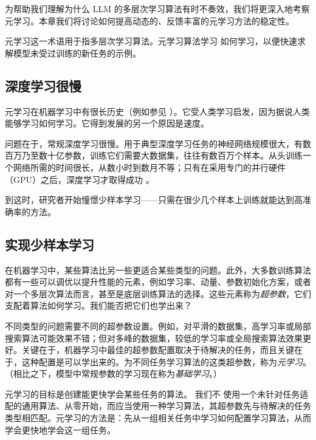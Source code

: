 为帮助我们理解为什么 LLM 的多层次学习算法有时不奏效，我们将更深入地考察元学习。本章我们将讨论如何提高动态的、反馈丰富的元学习方法的稳定性。



元学习这一术语用于指多层次学习算法。元学习算法学习
如何学习，以便快速求解模型未受过训练的新任务的示例。
    
\subsection{深度学习很慢}
元学习在机器学习中有很长历史（例如参见 \citet{schmidhuber1987evolutionary,hospedales2021meta,huisman2021survey}）。它受人类学习启发，因为据说人类能够学习如何学习。它得到发展的另一个原因是速度。

问题在于，常规深度学习很慢。用于典型深度学习任务的神经网络规模很大，有数百万乃至数十亿参数，训练它们需要大数据集，往往有数百万个样本。从头训练一个网络所需的时间很长，从数小时到数月不等；只有在采用专门的并行硬件（GPU）之后，深度学习才取得成功 \citep{krizhevsky2012imagenet}。

到这时，研究者开始憧憬少样本学习——只需在很少几个样本上训练就能达到高准确率的方法。

  
\subsection{实现少样本学习}
在机器学习中，某些算法比另一些更适合某些类型的问题。此外，大多数训练算法都有一些可以调优以提升性能的元素，例如学习率、动量、参数初始化方案，或者对一个多层次算法而言，甚至是底层训练算法的选择。这些元素称为{\em 超参数}，它们支配着算法如何学习。我们能否把它们也学出来？

不同类型的问题需要不同的超参数设置。例如，对平滑的数据集，高学习率或局部搜索算法可能效果不错；但对多峰的数据集，较低的学习率或全局搜索算法效果更好。关键在于，机器学习中最佳的超参数配置取决于待解决的任务，而且关键在于，这种配置是可以学出来的。为不同任务学习算法的这类超参数，称为{\em 元学习}。（相比之下，模型中常规参数的学习现在称为{\em 基础学习}。）

元学习的目标是创建能更快学会某些任务的算法。
我们不%
使用一个未针对任务适配的通用算法、从零开始，而应当使用一种学习算法，其超参数先与待解决的任务类型相匹配。元学习的方法是：先从一组相关任务中学习如何配置学习算法，从而学会更快地学会这一组任务。

